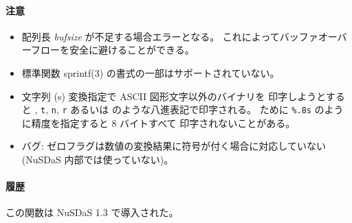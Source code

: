 \paragraph{注意}
\begin{itemize}
\item 配列長 {\it bufsize} が不足する場合エラーとなる。
これによってバッファオーバーフローを安全に避けることができる。
\item 標準関数 sprintf(3) の書式の一部はサポートされていない。
\item 文字列 (s) 変換指定で ASCII 図形文字以外のバイナリを
印字しようとすると
{\tt {}},
{\tt \BACKSLASH t},
{\tt \BACKSLASH n},
{\tt \BACKSLASH r} あるいは
{\tt {}} のような八進表記で印字される。
ために {\tt \%.8s} のように精度を指定すると 8 バイトすべて
印字されないことがある。
\item バグ: ゼロフラグは数値の変換結果に符号が付く場合に対応していない
(NuSDaS 内部では使っていない)。
\end{itemize}
\paragraph{履歴}
この関数は NuSDaS 1.3 で導入された。
